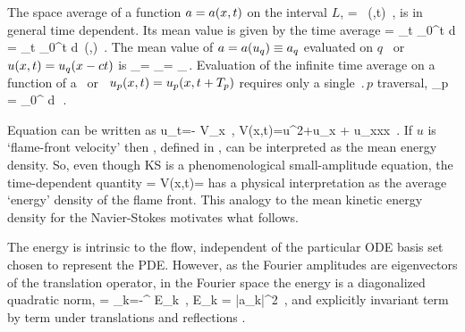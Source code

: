 The {space average} of a function $a = a(x,t)$  on
the interval $L$,
\beq
    \expct{\obser} = \Lint{\pSpace}\, \obser(\pSpace,t)
    \,,
    \label{rpo:spac_ave}
\eeq
is in general time dependent.
Its mean value is given by the {time average}
\beq
\timeAver{\obser}
    =
\lim_{t\rightarrow \infty}  \int_0^t \! d\tau \, \expct{\obser}
    =
\lim_{t\rightarrow \infty}  \int_0^t \!
    \Lint{\tau}  d\pSpace\, \obser(\pSpace,\tau)
    \,.
\label{rpo:tim_ave}
\eeq
The mean value
of $a = a(u_q) \equiv a_q$ evaluated on $q$
\eqv\ or {\reqv} $u(x,t) = u_q(x-ct)$ is
\beq
\timeAver{\obser}_\stagn = \expct{\obser}_\stagn = \obser_\stagn\,.
\label{rpo:u-eqv} \eeq Evaluation of the infinite time average
 on a function of a \po\ or \rpo\
$u_p(x,t)=u_p(x,t+{T_{p}})$ requires only a single
$\period{p}$ traversal,
\beq
  \timeAver{\obser}_p = 
    \int_0^{\period{p}} \! d\tau \, \expct{\obser}
\,.
\label{rpo:u-cyc}
\eeq

Equation  can be written as %
\beq
    u_t=- V_x
        \,,\qquad
    V(x,t)={\textstyle{}}u^2+u_{x} + u_{xxx}
    \,.
 If $u$ is `flame-front velocity' then \expctE, defined in
\refeq{eq:stdks}, can be interpreted as the mean energy density.
%
So, even though KS is a phenomenological
small-amplitude equation, the time-dependent quantity
\beq
    \expctE=
  \Lint{\pSpace}
  V(x,t)=
  \Lint{\pSpace} 
  \label{ksEnergy} \eeq
has a physical interpretation as the average `energy'
density of the flame front. This analogy to the mean kinetic energy
density for the Navier-Stokes motivates what follows.

The energy  is intrinsic to
the flow, independent of the particular ODE basis set
chosen to represent the PDE. However, as the Fourier
amplitudes are eigenvectors of the translation operator,
in the Fourier space the energy is a diagonalized
quadratic norm,
\beq
\expctE   %
          =  \sum_{k=-\infty}^{\infty} E_k
\,,\qquad
E_k = %
    {\textstyle{}}|a_k|^2
\,,
and explicitly invariant term by term
under translations %
and reflections .


